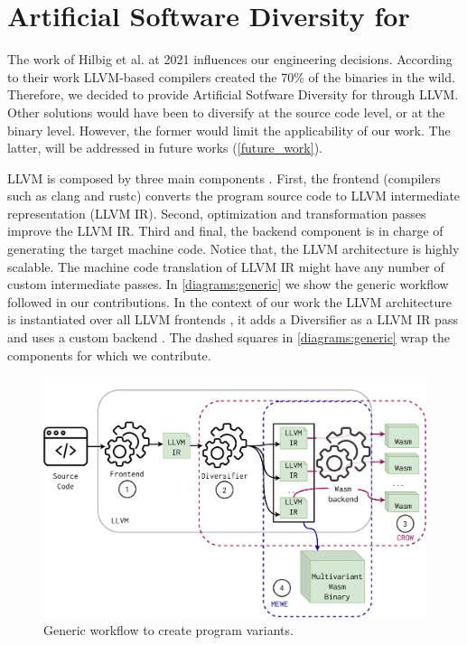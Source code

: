 \section{Artificial Software Diversity for \wasm}
\label{tech:generic}

The work of Hilbig et al. \cite{Hilbig2021AnES} at 2021 influences our engineering decisions. According to their work LLVM-based compilers created the 70\% of the \wasm binaries in the wild. Therefore, we decided to provide Artificial Sotfware Diversity for \wasm through LLVM. 
Other solutions would have been to diversify at the source code level, or at the \wasm binary level. However, the former would limit the applicability of our work. The latter, will be addressed in future works (\autoref{future_work}).

LLVM is composed by three main components \citationneeded. First, the frontend (compilers such as clang and rustc) converts the program source code to LLVM intermediate representation (LLVM IR). Second, optimization and transformation passes improve the LLVM IR. Third and final, the backend component is in charge of generating the target machine code. Notice that, the LLVM architecture is highly scalable. The machine code translation of LLVM IR might have any number of custom intermediate passes. In \autoref{diagrams:generic} we show the generic workflow followed in our contributions. 
In the context of our work the LLVM architecture is instantiated over all LLVM frontends , it adds a Diversifier as a LLVM IR pass  and uses a custom backend .
The dashed squares in \autoref{diagrams:generic} wrap the components for which we contribute.

\begin{figure}[h]
    \includegraphics[width=\linewidth]{diagrams/architecture.pdf}
    \caption{Generic workflow to create \wasm program variants.}
    \label{diagrams:generic}
\end{figure}


